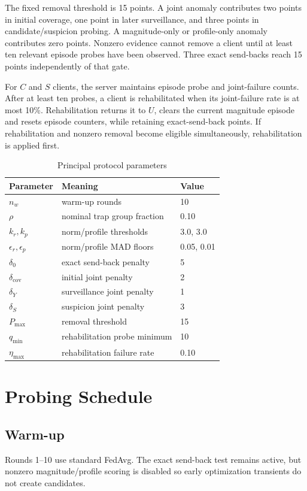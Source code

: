 The fixed removal threshold is 15 points. A joint anomaly contributes two points in initial coverage, one point in later surveillance, and three points in candidate/suspicion probing. A magnitude-only or profile-only anomaly contributes zero points. Nonzero evidence cannot remove a client until at least ten relevant episode probes have been observed. Three exact send-backs reach 15 points independently of that gate.

For $C$ and $S$ clients, the server maintains episode probe and joint-failure counts. After at least ten probes, a client is rehabilitated when its joint-failure rate is at most 10\%. Rehabilitation returns it to $U$, clears the current magnitude episode and resets episode counters, while retaining exact-send-back points. If rehabilitation and nonzero removal become eligible simultaneously, rehabilitation is applied first.

\begin{table}[htbp]
\centering
\caption{Principal protocol parameters}
\label{tab:v8-parameters}
\begin{tabular}{lll}
\toprule
Parameter & Meaning & Value \\
\midrule
$n_w$ & warm-up rounds & 10 \\
$\rho$ & nominal trap group fraction & 0.10 \\
$k_r,k_p$ & norm/profile thresholds & 3.0, 3.0 \\
$\epsilon_r,\epsilon_p$ & norm/profile MAD floors & 0.05, 0.01 \\
$\delta_0$ & exact send-back penalty & 5 \\
$\delta_{\mathrm{cov}}$ & initial joint penalty & 2 \\
$\delta_Y$ & surveillance joint penalty & 1 \\
$\delta_S$ & suspicion joint penalty & 3 \\
$P_{\max}$ & removal threshold & 15 \\
$q_{\min}$ & rehabilitation probe minimum & 10 \\
$\eta_{\max}$ & rehabilitation failure rate & 0.10 \\
\bottomrule
\end{tabular}
\end{table}

\section{Probing Schedule}

\subsection{Warm-up}
Rounds 1--10 use standard FedAvg. The exact send-back test remains active, but nonzero magnitude/profile scoring is disabled so early optimization transients do not create candidates.

